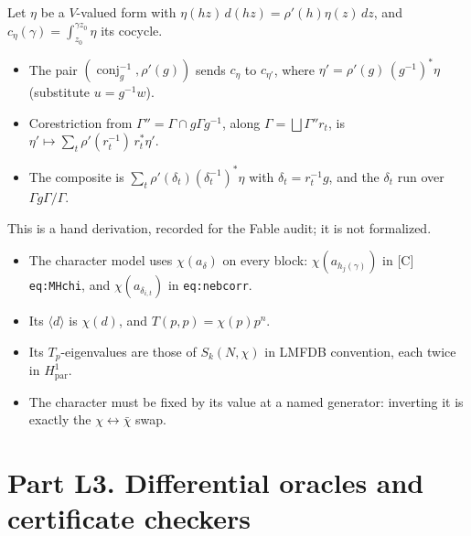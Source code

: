 \begin{remark}\label{rmk:nebtransport}
  Let $\eta$ be a $V$-valued form with $\eta(hz)\,d(hz)=\rho'(h)\eta(z)\,dz$, and $c_\eta(\gamma)=\int_{z_0}^{\gamma z_0}\eta$
  its cocycle.
  \begin{itemize}
    \item The pair $(\operatorname{conj}_g^{-1},\rho'(g))$ sends $c_\eta$ to $c_{\eta'}$, where
      $\eta'=\rho'(g)\,(g^{-1})^{*}\eta$ (substitute $u=g^{-1}w$).
    \item Corestriction from $\Gamma''=\Gamma\cap g\Gamma g^{-1}$, along $\Gamma=\bigsqcup\Gamma''r_t$, is
      $\eta'\mapsto\sum_t\rho'(r_t^{-1})\,r_t^{*}\eta'$.
    \item The composite is $\sum_t\rho'(\delta_t)(\delta_t^{-1})^{*}\eta$ with $\delta_t=r_t^{-1}g$, and the
      $\delta_t$ run over $\Gamma g\Gamma/\Gamma$.
  \end{itemize}
  This is a hand derivation, recorded for the Fable audit; it is not formalized.
\end{remark}

\begin{remark}\label{rmk:nebhandoff}
  \begin{itemize}
    \item The character model uses $\chi(a_\delta)$ on every block: $\chi(a_{h_j(\gamma)})$ in [C] \texttt{eq:MHchi}, and
      $\chi(a_{\delta_{i,t}})$ in \texttt{eq:nebcorr}.
    \item Its $\langle d\rangle$ is $\chi(d)$, and $T(p,p)=\chi(p)p^n$.
    \item Its $T_p$-eigenvalues are those of $S_k(N,\chi)$ in LMFDB convention, each twice in $H^1_{\mathrm{par}}$.
    \item The character must be fixed by its value at a named generator: inverting it is exactly the
      $\chi\leftrightarrow\bar\chi$ swap.
  \end{itemize}
\end{remark}

\chapter{Part L3. Differential oracles and certificate checkers}\label{ch:checkers}

